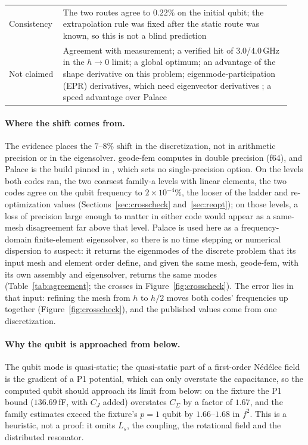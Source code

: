 \documentclass{anvil-paper}
\begin{document}
\begin{table}[htbp]
\begin{tabular}{@{}>{\raggedright\arraybackslash}p{0.17\linewidth}>{\raggedright\arraybackslash}p{0.77\linewidth}@{}}
    Consistency & The two routes agree to $0.22\%$ on the initial qubit; the extrapolation rule was fixed after the static route was known, so this is not a blind prediction \\
    Not claimed & Agreement with measurement; a verified hit of $3.0$/$4.0$\,GHz in the $h \to 0$ limit; a global optimum; an advantage of the shape derivative on this problem; eigenmode-participation (EPR) derivatives, which need eigenvector derivatives \citep{nelson1976simplified}; a speed advantage over Palace \\
    \bottomrule
  \end{tabular}
\end{table}

\paragraph{Where the shift comes from.}
The evidence places the $7$--$8\%$ shift in the discretization, not in
arithmetic precision or in the eigensolver. geode-fem computes in double
precision (f64), and Palace is the build pinned in
, which sets no single-precision
option. On the levels both codes ran, the two coarsest family-a levels
with linear elements, the two codes agree on the qubit frequency to
$2\times10^{-4}\%$, the looser of the ladder and re-optimization values
(Sections~\ref{sec:crosscheck} and~\ref{sec:reopt}); on those levels, a
loss of precision large enough to matter in either code would appear as a
same-mesh disagreement far above that level. Palace is used here as a
frequency-domain finite-element eigensolver, so there is no time stepping
or numerical dispersion to suspect: it returns the eigenmodes of the
discrete problem that its input
mesh and element order define, and given the same mesh, geode-fem, with
its own assembly and eigensolver, returns the same modes
(Table~\ref{tab:agreement}; the crosses in Figure~\ref{fig:crosscheck}).
The error lies in that input: refining the mesh from $h$ to $h/2$ moves
both codes' frequencies up together (Figure~\ref{fig:crosscheck}), and
the published values come from one discretization.

\paragraph{Why the qubit is approached from below.}
The qubit mode is quasi-static; the quasi-static part of a first-order
N\'ed\'elec field is the gradient of a P1 potential, which can only
overstate the capacitance, so the computed qubit should approach its limit
from below: on the fixture the P1 bound ($136.69$\,fF, with $C_J$ added)
overstates $C_\Sigma$ by a factor of $1.67$, and the family estimates exceed
the fixture's $p = 1$ qubit by $1.66$--$1.68$ in $f^2$. This is a heuristic, not a proof: it omits $L_s$,
the coupling, the rotational field and the distributed resonator.
\end{document}
